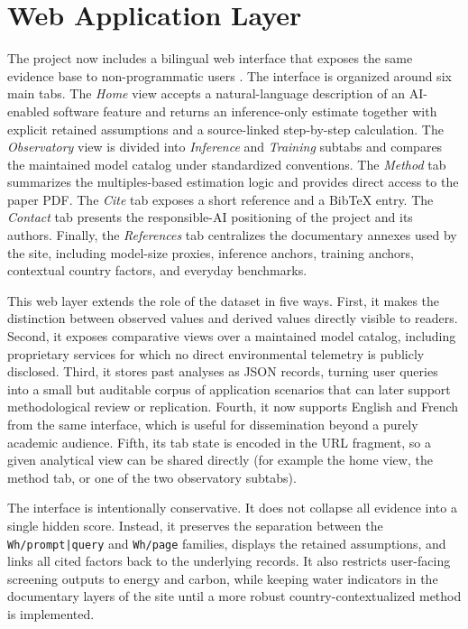 \documentclass[11pt,a4paper]{article}
\begin{document}
\section{Web Application Layer}
The project now includes a bilingual web interface that exposes the same evidence base to non-programmatic users \cite{impactllmrepo2026}. The interface is organized around six main tabs. The \emph{Home} view accepts a natural-language description of an AI-enabled software feature and returns an inference-only estimate together with explicit retained assumptions and a source-linked step-by-step calculation. The \emph{Observatory} view is divided into \emph{Inference} and \emph{Training} subtabs and compares the maintained model catalog under standardized conventions. The \emph{Method} tab summarizes the multiples-based estimation logic and provides direct access to the paper PDF. The \emph{Cite} tab exposes a short reference and a BibTeX entry. The \emph{Contact} tab presents the responsible-AI positioning of the project and its authors. Finally, the \emph{References} tab centralizes the documentary annexes used by the site, including model-size proxies, inference anchors, training anchors, contextual country factors, and everyday benchmarks.

This web layer extends the role of the dataset in five ways. First, it makes the distinction between observed values and derived values directly visible to readers. Second, it exposes comparative views over a maintained model catalog, including proprietary services for which no direct environmental telemetry is publicly disclosed. Third, it stores past analyses as JSON records, turning user queries into a small but auditable corpus of application scenarios that can later support methodological review or replication. Fourth, it now supports English and French from the same interface, which is useful for dissemination beyond a purely academic audience. Fifth, its tab state is encoded in the URL fragment, so a given analytical view can be shared directly (for example the home view, the method tab, or one of the two observatory subtabs).

The interface is intentionally conservative. It does not collapse all evidence into a single hidden score. Instead, it preserves the separation between the \texttt{Wh/prompt|query} and \texttt{Wh/page} families, displays the retained assumptions, and links all cited factors back to the underlying records. It also restricts user-facing screening outputs to energy and carbon, while keeping water indicators in the documentary layers of the site until a more robust country-contextualized method is implemented.
\end{document}
